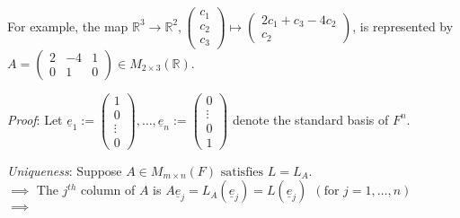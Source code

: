 \documentclass[
  12pt,
  a4paper,
  twoside]{article}
\theoremstyle{plain}
\theoremstyle{definition}
\begin{document}
For example, the map \(\mathbb{R}^{3} \to \mathbb{R}^{2}, \begin{pmatrix} c_{1} \\ c_{2} \\ c_{3} \end{pmatrix} \mapsto \begin{pmatrix} 2c_{1} + c_{3} - 4c_{2} \\ c_{2} \end{pmatrix}\), is represented by \(A = \begin{pmatrix} 2 & -4 & 1 \\ 0 & 1 & 0 \end{pmatrix} \in M_{2 \times 3}( \mathbb{R})\).

\emph{Proof}:
Let \(\underline{e}_{1}:= \begin{pmatrix} 1 \\ 0 \\ \vdots \\ 0 \end{pmatrix} , \dots, \underline{e}_{n} := \begin{pmatrix} 0 \\ \vdots \\ 0 \\ 1 \end{pmatrix}\) denote the standard basis of \(F^{n}\).

\emph{Uniqueness}: Suppose \(A \in M_{m \times n}(F) \text{ satisfies } L=L_{A}\).\\
\(\implies\) The \(j^{th}\) column of \(A\) is \(A \underline{e}_{j} = L_{A}( \underline{e}_{j}) = L( \underline{e}_{j}) \ \ (\text{for } j=1, \dots, n)\)\\
\(\implies\) 
\end{document}
